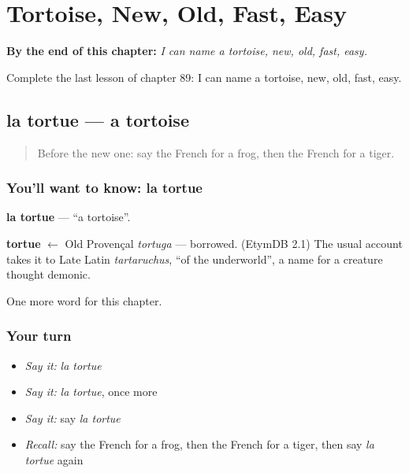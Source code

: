 
\chapter{Tortoise, New, Old, Fast, Easy}
\label{ch:fr-tortoise-new-old-fast-easy}

\begin{chapteropening}
\textbf{By the end of this chapter:} \emph{I can name a tortoise, new, old, fast, easy.}

Complete the last lesson of chapter 89: I can name a tortoise, new, old, fast, easy.
\end{chapteropening}

\section[la tortue]{la tortue — a tortoise}

\label{lesson:FR-C89-tortue}



\begin{quote}
Before the new one: say the French for a frog, then the French for a tiger.
\end{quote}

\subsection*{You'll want to know: la tortue}
\textbf{la tortue} — \textquotedblleft{}a tortoise\textquotedblright{}.

\begin{cousinweb}
\textbf{tortue} $\leftarrow$ Old Provençal \emph{tortuga} — borrowed. (EtymDB 2.1) The usual account takes it to Late Latin \emph{tartaruchus}, \textquotedblleft{}of the underworld\textquotedblright{}, a name for a creature thought demonic.
\end{cousinweb}

\begin{grammarlens}[title={What you've built}]
One more word for this chapter.
\end{grammarlens}

\subsection*{Your turn}
\begin{itemize}
\raggedright
  \item \emph{Say it:} \emph{la tortue}
  \item \emph{Say it:} \emph{la tortue}, once more
  \item \emph{Say it:} say \emph{la tortue}
  \item \emph{Recall:} say the French for a frog, then the French for a tiger, then say \emph{la tortue} again
\end{itemize}


